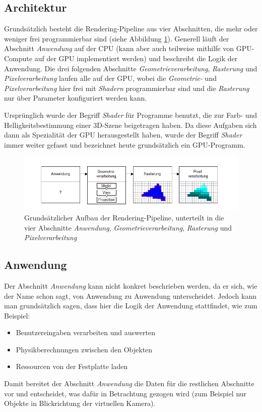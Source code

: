 \documentclass[oneside]{ausarbeitung}
\begin{document}
\subsection{Architektur}
Grundsätzlich besteht die Rendering-Pipeline aus vier Abschnitten, die mehr oder weniger frei programmierbar sind (siehe Abbildung \ref{fig:render_pipeline}). Generell läuft der Abschnitt \textit{Anwendung} auf der \ac{CPU} (kann aber auch teilweise mithilfe von \ac{GPU}-Compute auf der \ac{GPU} implementiert werden) und beschreibt die Logik der Anwendung. Die drei folgenden Abschnitte \textit{Geometrieverarbeitung}, \textit{Rasterung} und \textit{Pixelverarbeitung} laufen alle auf der \ac{GPU}, wobei die \textit{Geometrie-} und \textit{Pixelverarbeitung} hier frei mit \textit{Shadern} programmierbar sind und die \textit{Rasterung} nur über Parameter konfiguriert werden kann.

Ursprünglich wurde der Begriff \textit{Shader} für Programme benutzt, die zur Farb- und Helligkeitsbestimmung einer 3D-Szene beigetragen haben. Da diese Aufgaben sich dann als Spezialität der \ac{GPU} herausgestellt haben, wurde der Begriff \textit{Shader} immer weiter gefasst und bezeichnet heute grundsätzlich ein \ac{GPU}-Programm.

\begin{figure}
    \includegraphics[width=\textwidth]{images/render_pipeline.png}
    \caption{Grundsätzlicher Aufbau der Rendering-Pipeline, unterteilt in die vier Abschnitte \textit{Anwendung}, \textit{Geometrieverarbeitung}, \textit{Rasterung} und \textit{Pixelverarbeitung}}
    \label{fig:render_pipeline}
\end{figure}

\subsection{Anwendung}
Der Abschnitt \textit{Anwendung} kann nicht konkret beschrieben werden, da er sich, wie der Name schon sagt, von Anwendung zu Anwendung unterscheidet. Jedoch kann man grundsätzlich sagen, dass hier die Logik der Anwendung stattfindet, wie zum Beispiel:
\begin{itemize}
\item{Benutzereingaben verarbeiten und auswerten}
\item{Physikberechnungen zwischen den Objekten}
\item{Ressourcen von der Festplatte laden}
\end{itemize}
Damit bereitet der Abschnitt \textit{Anwendung} die Daten für die restlichen Abschnitte vor und entscheidet, was dafür in Betrachtung gezogen wird (zum Beispiel nur Objekte in Blickrichtung der virtuellen Kamera).
\end{document}
